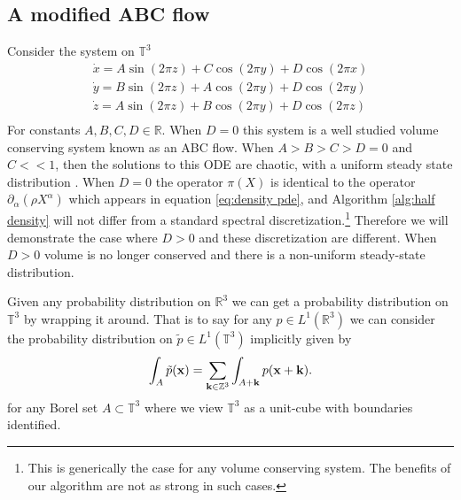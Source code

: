 \documentclass[12pt]{amsart}
\begin{document}
\subsection{A modified ABC flow}
Consider the system on $\mathbb{T}^{3}$
\begin{align}
	\dot{x} = A \sin( 2\pi z) + C \cos(2\pi y)  + D \cos(2\pi x)\\
	\dot{y} = B \sin( 2\pi z) + A \cos(2\pi y)  + D \cos(2\pi y)\\
	\dot{z} = A \sin( 2\pi z) + B \cos(2\pi y)  + D \cos(2\pi z)\\
\end{align}
For constants $A,B,C,D \in \mathbb{R}$.  When $D=0$ this system is a well studied volume conserving system known as an ABC flow.
When $A > B > C > D = 0$ and $C << 1$, then the solutions to this ODE are chaotic, with a uniform steady state distribution \cite{MajdaBertozzi2002}.
When $D=0$ the operator $\pi(X)$ is identical to the operator $\partial_{\alpha}( \rho X^{\alpha})$ which appears in equation \eqref{eq:density pde},
and Algorithm \ref{alg:half density} will not differ from a standard spectral discretization.\footnote{This is generically the case for any volume conserving system.  The benefits of our algorithm are not as strong in such cases.}
Therefore we will demonstrate the case where $D > 0$ and these discretization are different.
When $D> 0$ volume is no longer conserved and there is a non-uniform steady-state distribution.

Given any probability distribution on $\mathbb{R}^{3}$ we can get a probability distribution on $\mathbb{T}^{3}$ by wrapping it around.
That is to say for any $p \in L^{1}(\mathbb{R}^{3})$ we can consider the probability distribution on $\tilde{p} \in L^{1}(\mathbb{T}^{3})$ implicitly given by
\begin{align*}
	\int_{A} \tilde{p}( {\bf x} ) = \sum_{ {\bf k} \in \mathbb{Z}^{3} } \int_{A + {\bf k} } p( {\bf x} + {\bf k} ).
\end{align*}
for any Borel set $A \subset \mathbb{T}^{3}$ where we view $\mathbb{T}^{3}$ as a unit-cube with boundaries identified.
\end{document}
